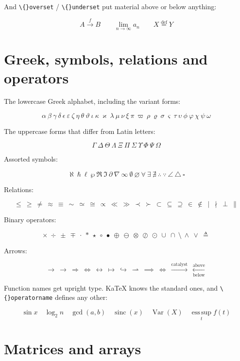And \texttt{\textbackslash\{\}overset} / \texttt{\textbackslash\{\}underset} put material above or below anything:

\[
A \overset{f}{\longrightarrow} B \qquad \underset{n \to \infty}{\lim} a_n \qquad X \overset{\text{def}}{=} Y
\]

\section{Greek, symbols, relations and operators}

The lowercase Greek alphabet, including the variant forms:

\[
\alpha\ \beta\ \gamma\ \delta\ \epsilon\ \varepsilon\ \zeta\ \eta\ \theta\ \vartheta\ \iota\ \kappa\ \varkappa\ \lambda\ \mu\ \nu\ \xi\ \pi\ \varpi\ \rho\ \varrho\ \sigma\ \varsigma\ \tau\ \upsilon\ \phi\ \varphi\ \chi\ \psi\ \omega
\]

The uppercase forms that differ from Latin letters:

\[
\Gamma\ \Delta\ \Theta\ \Lambda\ \Xi\ \Pi\ \Sigma\ \Upsilon\ \Phi\ \Psi\ \Omega
\]

Assorted symbols:

\[
\aleph\ \hbar\ \ell\ \wp\ \Re\ \Im\ \partial\ \nabla\ \infty\ \emptyset\ \varnothing\ \forall\ \exists\ \nexists\ \therefore\ \because\ \angle\ \triangle\ \square
\]

Relations:

\[
\le\ \ge\ \ne\ \approx\ \equiv\ \sim\ \simeq\ \cong\ \propto\ \ll\ \gg\ \prec\ \succ\ \subset\ \subseteq\ \supseteq\ \in\ \notin\ \mid\ \nmid\ \perp\ \parallel
\]

Binary operators:

\[
\times\ \div\ \pm\ \mp\ \cdot\ \ast\ \star\ \circ\ \bullet\ \oplus\ \ominus\ \otimes\ \oslash\ \odot\ \cup\ \cap\ \setminus\ \wedge\ \vee\ \triangleq
\]

Arrows:

\[
\to\ \rightarrow\ \Rightarrow\ \Leftrightarrow\ \leftrightarrow\ \mapsto\ \hookrightarrow\ \rightharpoonup\ \implies\ \iff\ \xrightarrow{\text{catalyst}}\ \xleftarrow[\text{below}]{\text{above}}
\]

Function names get upright type. KaTeX knows the standard ones, and \texttt{\textbackslash\{\}operatorname} defines any other:

\[
\sin x \quad \log_2 n \quad \gcd(a, b) \quad \operatorname{sinc}(x) \quad \operatorname{Var}(X) \quad \operatorname*{ess\,sup}_{t} f(t)
\]

\section{Matrices and arrays}

